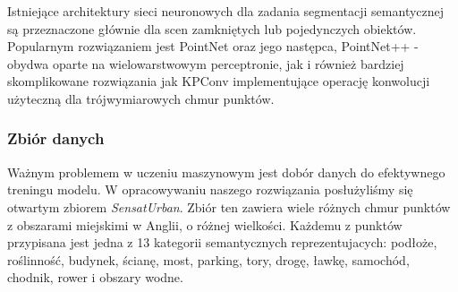 Istniejące architektury sieci neuronowych dla zadania segmentacji semantycznej są przeznaczone głównie dla scen zamkniętych lub pojedynczych obiektów. Popularnym rozwiązaniem jest PointNet\cite{pointnet} oraz jego następca, PointNet++\cite{qi2017pointnetdeephierarchicalfeature} - obydwa oparte na wielowarstwowym perceptronie, jak i również bardziej skomplikowane rozwiązania jak KPConv\cite{thomas2019kpconvflexibledeformableconvolution} implementujące operację konwolucji użyteczną dla trójwymiarowych chmur punktów.

\subsubsection{Zbiór danych}

Ważnym problemem w uczeniu maszynowym jest dobór danych do efektywnego treningu modelu. W opracowywaniu naszego rozwiązania posłużyliśmy się otwartym zbiorem \textit{SensatUrban}\cite{hu2022sensaturban}. Zbiór ten zawiera wiele różnych chmur punktów z obszarami miejskimi w Anglii, o różnej wielkości. Każdemu z punktów przypisana jest jedna z 13 kategorii semantycznych reprezentujacych: podłoże, roślinność, budynek, ścianę, most, parking, tory, drogę, ławkę, samochód, chodnik, rower i obszary wodne. 